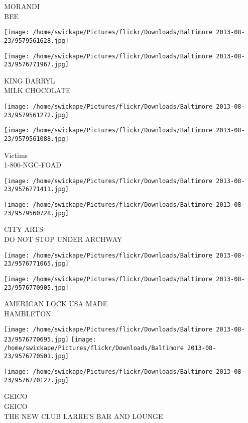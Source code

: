 \documentclass[10pt,letterpaper]{article}
\begin{document}
MORANDI\\
BEE\\
\pagebreak

\texttt{[image: /home/swickape/Pictures/flickr/Downloads/Baltimore 2013-08-23/9579561628.jpg]}

\vspace{0.25in}
\texttt{[image: /home/swickape/Pictures/flickr/Downloads/Baltimore 2013-08-23/9576771967.jpg]}

KING DARRYL\\
MILK CHOCOLATE\\
\pagebreak

\texttt{[image: /home/swickape/Pictures/flickr/Downloads/Baltimore 2013-08-23/9579561272.jpg]}

\vspace{0.25in}
\texttt{[image: /home/swickape/Pictures/flickr/Downloads/Baltimore 2013-08-23/9579561088.jpg]}

Victims\\
1{-}800{-}NGC{-}FOAD\\
\pagebreak

\texttt{[image: /home/swickape/Pictures/flickr/Downloads/Baltimore 2013-08-23/9576771411.jpg]}

\vspace{0.25in}
\texttt{[image: /home/swickape/Pictures/flickr/Downloads/Baltimore 2013-08-23/9579560728.jpg]}

CITY ARTS\\
DO NOT STOP UNDER ARCHWAY\\
\pagebreak

\texttt{[image: /home/swickape/Pictures/flickr/Downloads/Baltimore 2013-08-23/9576771065.jpg]}

\vspace{0.25in}
\texttt{[image: /home/swickape/Pictures/flickr/Downloads/Baltimore 2013-08-23/9576770905.jpg]}

AMERICAN LOCK USA MADE\\
HAMBLETON\\
\pagebreak

\texttt{[image: /home/swickape/Pictures/flickr/Downloads/Baltimore 2013-08-23/9576770695.jpg]}
\texttt{[image: /home/swickape/Pictures/flickr/Downloads/Baltimore 2013-08-23/9576770501.jpg]}

\vspace{0.25in}
\texttt{[image: /home/swickape/Pictures/flickr/Downloads/Baltimore 2013-08-23/9576770127.jpg]}

GEICO\\
GEICO\\
THE NEW CLUB LARRE'S BAR AND LOUNGE\\
\pagebreak
\end{document}
